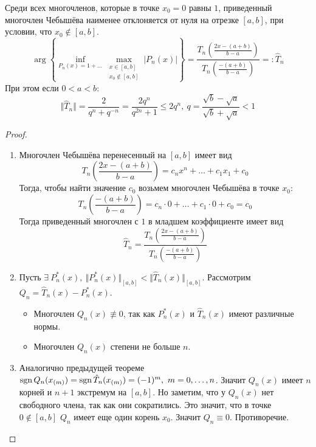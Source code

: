 \begin{theorem}
  Среди всех многочленов, которые в точке $x_0=0$ равны $1$,
  приведенный многочлен Чебышёва наименее
  отклоняется от нуля на отрезке $[a,b]$, при условии, что $x_0\notin[a,b]$.
  \[\arg\left\{\inf_{P_n(x)=1+\ldots}\max_{\substack{x\in[a,b] \\ x_0\notin[a,b]}}{|P_n(x)|}\right\}=\frac{T_n\left(\frac{2x-(a+b)}{b-a}\right)}{T_n\left(\frac{-(a+b)}{b-a}\right)}=:\hat{T}_n\]
  При этом если $0<a<b$:
  \[\Vert\hat{T}_n\Vert=\frac{2}{q^n+q^{-n}}=\frac{2q^n}{q^{2n}+1}\leq2q^n,\ q=\frac{\sqrt{b}-\sqrt{a}}{\sqrt{b}+\sqrt{a}}<1\]
\end{theorem}
\begin{proof}
  \begin{enumerate}
    \item Многочлен Чебышёва перенесенный на $[a,b]$ имеет вид
          \[T_n\left(\frac{2x-(a+b)}{b-a}\right)=c_{n}x^n+\ldots+c_1x_1+c_0\]
          Тогда, чтобы найти значение $c_0$ возьмем многочлен Чебышёва в точке $x_0$:
          \[T_n\left(\frac{-(a+b)}{b-a}\right)=c_n\cdot0+\ldots+c_1\cdot0+c_0=c_0\]
          Тогда приведенный многочлен с $1$ в младшем коэффициенте имеет вид
          \[\hat{T}_n=\frac{T_n\left(\frac{2x-(a+b)}{b-a}\right)}{T_n\left(\frac{-(a+b)}{b-a}\right)}\]
    \item Пусть $\exists\ P_n^*(x),\ \Vert P_n^*(x)\Vert_{[a,b]}<\Vert\hat{T}_n(x)\Vert_{[a,b]}$.
          Рассмотрим $Q_n=\hat{T}_n(x)-P_n^*(x)$.
          \begin{itemize}
            \item Многочлен $Q_{n}(x)\not\equiv0$, так
                  как $P_n^*(x)$ и $\hat{T}_n(x)$ имеют различные нормы.
            \item Многочлен $Q_{n}(x)$ степени не больше $n$.
          \end{itemize}
    \item Аналогично предыдущей теореме $\sgn{Q_n(x_{(m)})}=\sgn{\hat{T}_n(x_{(m)})}=(-1)^m,\ m=0,\ldots,n$.
          Значит $Q_n(x)$ имеет $n$ корней и $n+1$ экстремум на $[a,b]$. Но заметим, что у $Q_n(x)$ нет
          свободного члена, так как они сократились. Это значит, что в точке $0\notin[a,b]$ $Q_n$ имеет
          еще один корень $x_0$. Значит $Q_n\equiv0$. Противоречие.


\end{enumerate}
\end{proof}
